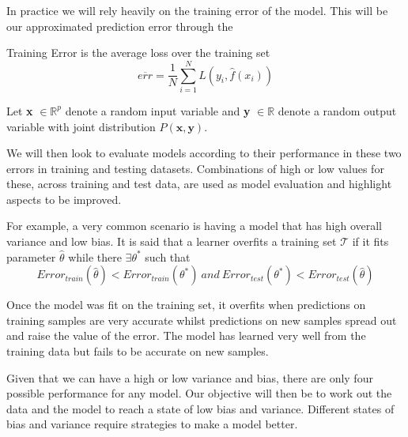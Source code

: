 In practice we will rely heavily on the training error of the model. This will be our approximated prediction error through the 
\begin{definition}{Training Error}
	is the average loss over the training set
	$$ \overline{err} = \frac{1}{N} \sum_{i=1}^N L(y_i, \hat{f}(x_i) )$$
\end{definition}


Let \textbf{x} $\in \mathbb{R}^{p}$ denote a random input variable and \textbf{y}  $\in \mathbb{R}$ denote a random output variable with joint distribution $P\left(\textbf{x},\textbf{y}\right)$.


We will then look to evaluate models according to their performance in these two errors in training and testing datasets. Combinations of high or low values for these, across training and test data, are used as model evaluation and highlight aspects to be improved. 

For example, a very common scenario is having a model that has high overall variance and low bias. 
It is said that a learner overfits a training set $\mathcal{T}$ if it fits parameter $\hat{\theta}$ while there $\exists \theta^*$ such that
\begin{equation} \label{eq:overfitting}
Error_{train}(\hat{\theta}) < Error_{train}(\theta^*) \  and \ Error_{test}(\theta^*) < Error_{test}(\hat{\theta})   
\end{equation}

Once the model was fit on the training set, it overfits when predictions on training samples are very accurate whilst predictions on new samples spread out and raise the value of the error. The model has learned very well from the training data but fails to be accurate on new samples.

Given that we can have a high or low variance and bias, there are only four possible performance for any model. Our objective will then be to work out the data and the model to reach a state of low bias and variance. Different states of bias and variance require strategies to make a model better.

